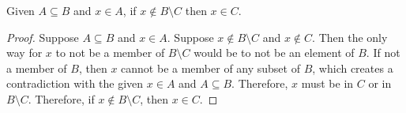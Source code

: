 
\begin{theorem}
  Given $A \subseteq B$ and $x \in A$, if $x \notin B\setminus C$ then $x
  \in C$. 
\end{theorem}

\begin{proof}
  Suppose $A \subseteq B$ and $x \in A$. Suppose $x \notin B\setminus C$ and
  $x \notin C$. Then the only way for $x$ to not be a member of $B \setminus
  C$ would be to not be an element of $B$. If not a member of $B$, then $x$
  cannot be a member of any subset of $B$, which creates a contradiction with
  the given $x \in A$ and $A \subseteq B$. Therefore, $x$ must be in $C$ or in
  $B \setminus C$. Therefore, if $x \notin B \setminus C$, then $x \in C$.
\end{proof}
